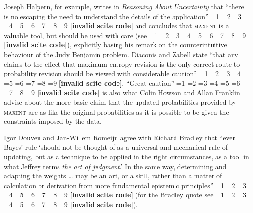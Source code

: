 \documentclass[smallextended]{svjour3}       %
\newcommand{\nonsc}[1]{}
\newcommand{\qeins}[1]{``#1''}
\newcommand{\qzwei}[1]{`#1'}
\newcommand{\PageP}{p.~}
\newcommand{\PageP}{}
\newcommand{\scite}[3]{\ifnum#1=1\cite{#2}\else
\ifnum#1=2\cite[{\PageP}~#3]{#2}\else
\ifnum#1=3\cite[{\PageP}~#3]{#2}\else
\ifnum#1=4\cite{#2}\else
\ifnum#1=5\cite{#2}\else
\ifnum#1=6\cite[{\PageP}~#3]{#2}\else
\ifnum#1=7\cite{#2}\else
\ifnum#1=8\cite[{\PageP}~#3]{#2}\else
\ifnum#1=9\cite[{\PageP}~#3]{#2}\else
\textbf{[invalid scite code]}\fi\fi\fi\fi\fi\fi\fi\fi\fi}
\begin{document}
Joseph Halpern, for example, writes in \emph{Reasoning About Uncertainty}
that \qeins{there is no escaping the need to understand the details of the
  application} \scite{2}{halpern03}{423} and concludes that \textsc{maxent}
is a valuable tool, but should be used with care (see
\scite{8}{grovehalpern97}{110}), explicitly basing his remark on the
counterintuitive behaviour of the Judy Benjamin problem. Diaconis and Zabell
state \qeins{that any claims to the effect that maximum-entropy revision is
  the only correct route to probability revision should be viewed with
  considerable caution} \scite{2}{diaconiszabell82}{829}. \qeins{Great
  caution} \scite{2}{howsonfranklin94}{456}\nonsc{} is also what Colin Howson
and Allan Franklin advise about the more basic claim that the updated
probabilities provided by \textsc{maxent} are as like the original
probabilities as it is possible to be given the constraints imposed by the
data.

Igor Douven and Jan-Willem Romeijn agree with Richard Bradley that
\qeins{even Bayes' rule \qzwei{should not be thought of as a universal
    and mechanical rule of updating, but as a technique to be applied
    in the right circumstances, as a tool in what Jeffrey terms
    \emph{the art of judgment}.} In the same way, determining and
  adapting the weights {\ldots} may be an art, or a skill, rather than
  a matter of calculation or derivation from more fundamental
  epistemic principles} \scite{2}{douvenromeijn09}{16} (for the
Bradley quote see \scite{8}{bradley05}{362}).

\end{document}
